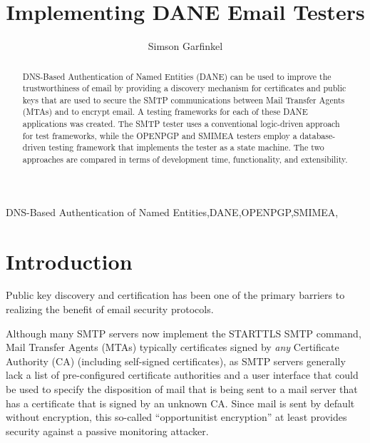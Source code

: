 \documentclass[preprint,5p]{elsarticle}
\begin{document}
\begin{frontmatter}

\title{Implementing DANE Email Testers}

\author{Simson Garfinkel}

\begin{abstract}
DNS-Based Authentication of Named Entities (DANE) can be used to
improve the trustworthiness of email by providing a discovery
mechanism for certificates and public keys that are used to secure the  SMTP communications
between Mail Transfer Agents (MTAs) and to encrypt email. A testing
frameworks for each of these DANE applications was created. The SMTP
tester uses a conventional logic-driven approach for test
frameworks, while the OPENPGP and SMIMEA testers employ a
database-driven testing framework that implements the tester as a
state machine. The two approaches are compared in terms of
development time, functionality, and extensibility.
\end{abstract}

\begin{keyword}
DNS-Based Authentication of Named Entities\sep DANE\sep OPENPGP\sep SMIMEA\sep 
\end{keyword}

\end{frontmatter}

\linenumbers

\section{Introduction}

Public key discovery and certification has been one of the primary
barriers to realizing the benefit of email security
protocols. 

Although many SMTP servers now implement the STARTTLS SMTP
command\cite{rfc3207}, Mail Transfer Agents (MTAs) typically
certificates signed by \emph{any} Certificate Authority (CA)
(including self-signed certificates), as SMTP servers generally lack a
list of pre-configured certificate authorities and a user interface
that could be used to specify the disposition of mail that is being
sent to a mail server that has a certificate that is signed by an
unknown CA. Since mail is sent by default without encryption, this
so-called ``opportunitist encryption'' at least provides security
against a passive monitoring attacker.
\end{document}
